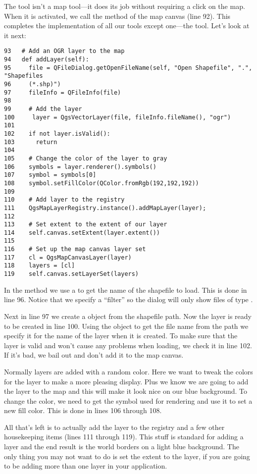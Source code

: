 The  tool isn't a map tool---it does its job without
requiring a click on the map. When it is activated, we call the
 method of the map canvas (line 92).
This completes the implementation of all our tools except one---the 
 tool. %
Let's look at it next:

\begin{verbatim}
93   # Add an OGR layer to the map
94   def addLayer(self):
95     file = QFileDialog.getOpenFileName(self, "Open Shapefile", ".", "Shapefiles
96     (*.shp)")
97     fileInfo = QFileInfo(file)
98 
99     # Add the layer
100     layer = QgsVectorLayer(file, fileInfo.fileName(), "ogr")
101
102    if not layer.isValid():
103      return
104
105    # Change the color of the layer to gray
106    symbols = layer.renderer().symbols()
107    symbol = symbols[0]
108    symbol.setFillColor(QColor.fromRgb(192,192,192))
109
110    # Add layer to the registry
111    QgsMapLayerRegistry.instance().addMapLayer(layer);
112
113    # Set extent to the extent of our layer
114    self.canvas.setExtent(layer.extent())
115
116    # Set up the map canvas layer set
117    cl = QgsMapCanvasLayer(layer)
118    layers = [cl]
119    self.canvas.setLayerSet(layers)
\end{verbatim}

In the  method we use a  to get the
name of the shapefile to load. This is done in line 96.
Notice that we specify a ``filter'' so the dialog will only show files of
type .

Next in line 97 we create a  object from the shapefile path. 
Now the layer is
ready to be created in line 100. Using the  object to get the 
file name
from the path we specify it for the name of the layer when it is created. 
To make sure that the layer is valid and won't
cause any problems when loading, we check it in line 102. If it's bad, we bail 
out and don't add it to
the map canvas.

Normally layers are added with a random color. Here we want to tweak the colors 
for the layer to make a more pleasing
display. Plus we know we are going to add the  layer 
to the map and this will make it look nice
on our blue background. To change the color, we need to get the symbol used for 
rendering and use it to set a new fill color. This is done in lines
106 through 108. 

All that's left is to actually add the layer to the registry and a few other 
housekeeping items (lines
111 through 119). This stuff is standard for adding a layer and the
end result is the world borders on a light blue background. The only thing you 
may not want to do is set the extent to
the layer, if you are going to be adding more than one layer in your application.

